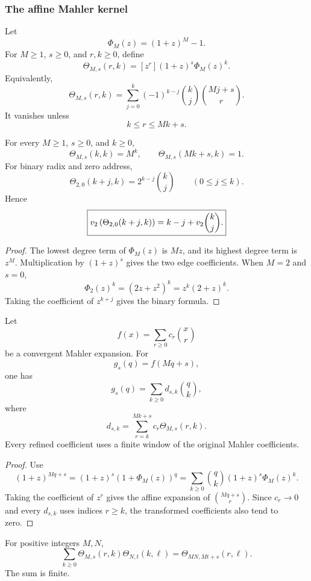 \subsubsection{The affine Mahler kernel}

Let
\[
\Phi_M(z)=(1+z)^M-1.
\]
For \(M\geq1\), \(s\geq0\), and \(r,k\geq0\), define
\[
\boxed{
\Theta_{M,s}(r,k)
=
[z^r](1+z)^s\Phi_M(z)^k.
}
\]
Equivalently,
\[
\boxed{
\Theta_{M,s}(r,k)
=
\sum_{j=0}^{k}
(-1)^{k-j}\binom kj\binom{Mj+s}{r}.
}
\]
It vanishes unless
\[
k\leq r\leq Mk+s.
\]

\begin{histproposition}\label{hist:prop:affine_kernel_edges}
For every \(M\geq1\), \(s\geq0\), and \(k\geq0\),
\[
\boxed{
\Theta_{M,s}(k,k)=M^k,
\qquad
\Theta_{M,s}(Mk+s,k)=1.
}
\]
For binary radix and zero address,
\[
\boxed{
\Theta_{2,0}(k+j,k)
=
2^{k-j}\binom kj
\qquad(0\leq j\leq k).
}
\]
Hence
\[
\boxed{
v_2\left(\Theta_{2,0}(k+j,k)\right)
=
k-j+v_2\binom kj.
}
\]
\end{histproposition}

\begin{proof}
The lowest degree term of \(\Phi_M(z)\) is \(Mz\), and its highest degree term is \(z^M\). Multiplication by \((1+z)^s\) gives the two edge coefficients. When \(M=2\) and \(s=0\),
\[
\Phi_2(z)^k
=
(2z+z^2)^k
=
z^k(2+z)^k.
\]
Taking the coefficient of \(z^{k+j}\) gives the binary formula.
\end{proof}

\begin{histtheorem}\label{hist:thm:mahler_polyphase_transfer}
Let
\[
f(x)=\sum_{r\geq0}c_r\binom xr
\]
be a convergent Mahler expansion. For
\[
g_s(q)=f(Mq+s),
\]
one has
\[
\boxed{
g_s(q)=\sum_{k\geq0}d_{s,k}\binom qk,}
\]
where
\[
\boxed{
d_{s,k}
=
\sum_{r=k}^{Mk+s}
c_r\Theta_{M,s}(r,k).
}
\]
Every refined coefficient uses a finite window of the original Mahler coefficients.
\end{histtheorem}

\begin{proof}
Use
\[
(1+z)^{Mq+s}
=
(1+z)^s\left(1+\Phi_M(z)\right)^q
=
\sum_{k\geq0}\binom qk(1+z)^s\Phi_M(z)^k.
\]
Taking the coefficient of \(z^r\) gives the affine expansion of \(\binom{Mq+s}{r}\). Since \(c_r\to0\) and every \(d_{s,k}\) uses indices \(r\geq k\), the transformed coefficients also tend to zero.
\end{proof}

\begin{histtheorem}\label{hist:thm:polyphase_kernel_composition}
For positive integers \(M,N\),
\[
\boxed{
\sum_{k\geq0}
\Theta_{M,s}(r,k)
\Theta_{N,t}(k,\ell)
=
\Theta_{MN,Mt+s}(r,\ell).
}
\]
The sum is finite.
\end{histtheorem}

